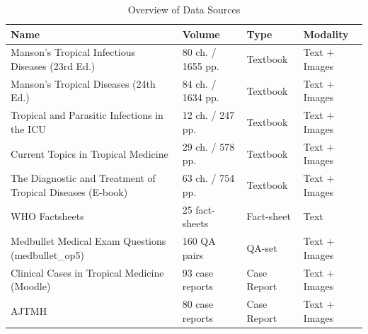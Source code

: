 \begin{table}[htbp]
\centering
\caption{Overview of Data Sources}
\begin{tabular}{llll}
\hline
\textbf{Name} & \textbf{Volume} & \textbf{Type} & \textbf{Modality} \\
\hline
Manson's Tropical Infectious Diseases (23rd Ed.) 
& 80 ch. / 1655 pp. & Textbook & Text + Images \\

Manson's Tropical Diseases (24th Ed.) 
& 84 ch. / 1634 pp. & Textbook & Text + Images \\

Tropical and Parasitic Infections in the ICU 
& 12 ch. / 247 pp. & Textbook & Text + Images \\

Current Topics in Tropical Medicine 
& 29 ch. / 578 pp. & Textbook & Text + Images \\

The Diagnostic and Treatment of Tropical Diseases (E-book)
& 63 ch. / 754 pp. & Textbook & Text + Images \\

WHO Factsheets
& 25 fact-sheets & Fact-sheet & Text \\

Medbullet Medical Exam Questions (medbullet\_op5)
& 160 QA pairs & QA-set & Text + Images \\

Clinical Cases in Tropical Medicine (Moodle)
& 93 case reports & Case Report & Text + Images \\

\acs{AJTMH} 
& 80 case reports & Case Report & Text + Images \\
\hline
\end{tabular}
\label{tab:data-sources}
\end{table}



